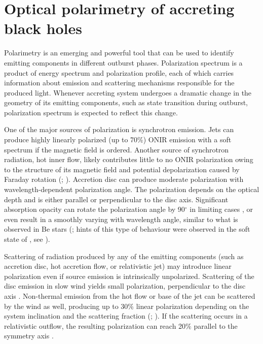 \chapter{Optical polarimetry of accreting black holes}
Polarimetry is an emerging and powerful tool that can be used to identify emitting components in different outburst phases.
Polarization spectrum is a product of energy spectrum and polarization profile, each of which carries information about emission and scattering mechanisms responsible for the produced light.
Whenever accreting system undergoes a dramatic change in the geometry of its emitting components, such as state transition during outburst, polarization spectrum is expected to reflect this change.

One of the major sources of polarization is synchrotron emission.
Jets can produce highly linearly polarized (up to 70\%) \gls{ONIR} emission with a soft spectrum \citep{Zdziarski2014} if the magnetic field is ordered.
Another source of synchrotron radiation, hot inner flow, likely contributes little to no \gls{ONIR} polarization owing to the structure of its magnetic field and potential depolarization caused by Faraday rotation (\citealt{Poutanen2014a}; \paperIII).
Accretion disc can produce moderate polarization with wavelength-dependent polarization angle.
The polarization depends on the optical depth \citep{Cha60, Sobolev1963, Beloborodov1999} and is either parallel or perpendicular to the disc axis.
Significant absorption opacity can rotate the polarization angle by 90$^\circ$ in limiting cases \citep{Nagirner1962, Gnedin1978}, or even result in a smoothly varying with wavelength angle, similar to what is observed in Be stars (\citealt{Poeckert1979}; hints of this type of behaviour were observed in the soft state of \MAXI, see \paperIII).

Scattering of radiation produced by any of the emitting components (such as accretion disc, hot accretion flow, or relativistic jet) may introduce linear polarization even if source emission is intrinsically unpolarized.
Scattering of the disc emission in slow wind yields small polarization, perpendicular to the disc axis \citep{Gnedin1997}.
Non-thermal emission from the hot flow or base of the jet can be scattered by the wind as well, producing up to 30\% linear polarization depending on the system inclination and the scattering fraction (\citealt{Sunyaev1985}; \paperIV).
If the scattering occurs in a relativistic outflow, the resulting polarization can reach 20\% parallel to the symmetry axis \citep{Beloborodov1998}.


